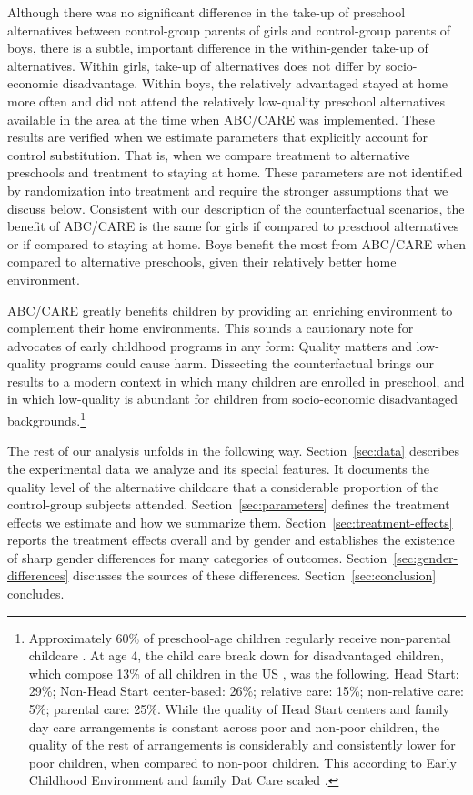 Although there was no significant difference in the take-up of preschool alternatives between control-group parents of girls and control-group parents of boys, there is a subtle, important difference in the within-gender take-up of alternatives. Within girls, take-up of alternatives does not differ by socio-economic disadvantage. Within boys, the relatively advantaged stayed at home more often and did not attend the relatively low-quality preschool alternatives available in the area at the time when ABC/CARE was implemented. These results are verified when we estimate parameters that explicitly account for control substitution. That is, when we compare treatment to alternative preschools and treatment to staying at home. These parameters are not identified by randomization into treatment and require the stronger assumptions that we discuss below. Consistent with our description of the counterfactual scenarios, the benefit of ABC/CARE is the same for girls if compared to preschool alternatives or if compared to staying at home. Boys benefit the most from ABC/CARE when compared to alternative preschools, given their relatively better home environment.

ABC/CARE greatly benefits children by providing an enriching environment to complement their home environments. This sounds a cautionary note for advocates of early childhood programs in any form: Quality matters and low-quality programs could cause harm. Dissecting the counterfactual brings our results to a modern context in which many children are enrolled in preschool, and in which low-quality is abundant for children from socio-economic disadvantaged backgrounds.\footnote{Approximately 60\% of preschool-age children regularly receive non-parental childcare \citep{FIFCFS_2009_Wellbeing_REPORT}. At age 4, the child care break down for disadvantaged children, which compose 13\% of all children in the US \citep{USCB_2014_CoverageReport}, was the following. Head Start: 29\%; Non-Head Start center-based: 26\%; relative care: 15\%; non-relative care: 5\%; parental care: 25\%. While the quality of Head Start centers and family day care arrangements is constant across poor and non-poor children, the quality of the rest of arrangements is considerably and consistently lower for poor children, when compared to non-poor children. This according to Early Childhood Environment and family Dat Care scaled \citep{FIFCFS_2009_Wellbeing_REPORT}.}

The rest of our analysis unfolds in the following way. Section~\ref{sec:data} describes the experimental data we analyze and its special features. It documents the quality level of the alternative childcare that a considerable proportion of the control-group subjects attended. Section~\ref{sec:parameters} defines the treatment effects we estimate and how we summarize them. Section~\ref{sec:treatment-effects} reports the treatment effects overall and by gender and establishes the existence of sharp gender differences for many categories of outcomes. Section~\ref{sec:gender-differences} discusses the sources of these differences. Section~\ref{sec:conclusion} concludes.
